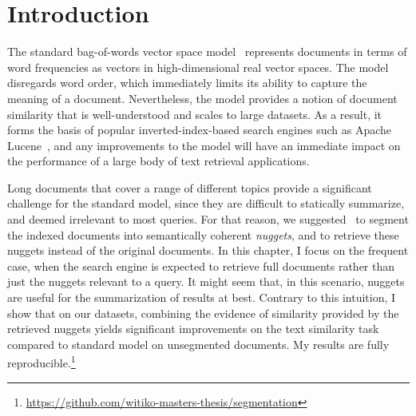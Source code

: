 \documentclass[
  digital, %
  notable, %
  lof,     %
  lot,     %
  nopalatino, color
]{fithesis3}
\newif\ifthesis\thesistrue
\newif\ifreview\reviewfalse
\let\term\emph
\let\note=\footnote
\let\emph=\textit
\begin{document}
\section{Introduction} 
%
%
%
%
The standard bag-of-words vector space model~\cite{ir:Salton1975}
represents documents in terms of word %
frequencies as vectors in high-dimensional real vector spaces.
\ifthesis The model disregards
word order, which immediately limits its ability to capture the meaning of a
document. Nevertheless, the \else The \fi model provides a notion of document
similarity that is well-understood and scales to large datasets. As a result,
it forms the basis of popular inverted-index-based search engines such as
Apache Lucene~\cite{bialecki12}, and any improvements to
the model will have an immediate impact on the performance of a large body of
text retrieval applications.

Long documents that cover a range of different topics provide a significant
challenge for the standard model, since they are difficult to statically
summarize, and deemed irrelevant to most queries. For that reason,
we suggested~\cite{rygletal16}
to segment the indexed documents into semantically coherent
\term{nuggets}, and to retrieve these nuggets
instead of the original documents. In this chapter, I focus on the frequent
case, when the search engine is expected to retrieve full documents rather than
just the nuggets relevant to a query. It might seem that, in this scenario,
nuggets are useful for the summarization of results at best.  Contrary to this
intuition, I show that on our datasets, combining the evidence of similarity
provided by the retrieved nuggets yields significant improvements on the text
similarity task compared to standard model on unsegmented
documents. My results are fully reproducible.\note{%
\ifreview
A link to the research data will be disclosed in the camera-ready
version of the paper.
\else
\url{https://github.com/witiko-masters-thesis/segmentation}
\fi}
\end{document}
